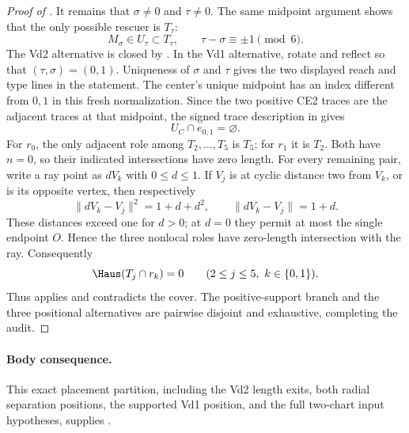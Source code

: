 \begin{proof}[Proof of ]
It remains that $\sigma\ne0$ and $\tau\ne0$.  The same midpoint argument
shows that the only possible rescuer is $T_\tau$:
\[
 M_\sigma\in U_\tau\subset T_\tau,
 \qquad \tau-\sigma\equiv\pm1\pmod6.
\]
The Vd2 alternative is closed by
.  In the Vd1 alternative, rotate and
reflect so that $(\tau,\sigma)=(0,1)$.  Uniqueness of $\sigma$ and $\tau$
gives the two displayed reach and type lines in the statement.  The center's
unique midpoint has an index different from $0,1$ in this fresh
normalization.  Since the two positive CE2 traces are the adjacent traces at
that midpoint, the signed trace description in
 gives
\[
 U_C\cap e_{0,1}=\varnothing.
\]
For $r_0$, the only adjacent role among $T_2,\ldots,T_5$ is $T_5$; for
$r_1$ it is $T_2$.  Both have $n=0$, so their indicated intersections have
zero length.  For every remaining pair, write a ray point as $dV_k$ with
$0\le d\le1$.  If $V_j$ is at cyclic distance two from $V_k$, or is its
opposite vertex, then respectively
\[
 \lVert dV_k-V_j\rVert^2=1+d+d^2,
 \qquad
 \lVert dV_k-V_j\rVert=1+d.
\]
These distances exceed one for $d>0$; at $d=0$ they permit at most the
single endpoint $O$.  Hence the three nonlocal roles have zero-length
intersection with the ray.  Consequently
\[
 \Haus(T_j\cap r_k)=0
 \qquad(2\le j\le5,\ k\in\{0,1\}).
\]
Thus  applies and contradicts the cover.
The positive-support branch and the three positional alternatives are
pairwise disjoint and exhaustive, completing the audit.
\end{proof}

\paragraph{Body consequence.}
This exact placement partition, including the Vd2 length exits, both radial
separation positions, the supported Vd1 position, and the full two-chart
input hypotheses, supplies .
